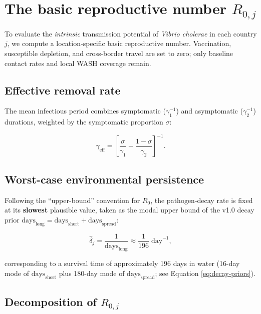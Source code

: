 \documentclass[
]{book}
\begin{document}
\section{\texorpdfstring{The basic reproductive number \(R_{0,j}\)}{The basic reproductive number R\_\{0,j\}}}\label{the-basic-reproductive-number-r_0j}

To evaluate the \emph{intrinsic} transmission potential of \emph{Vibrio cholerae} in each country \(j\), we compute a location‐specific basic reproductive number. Vaccination, susceptible depletion, and cross-border travel are set to zero; only baseline contact rates and local WASH coverage remain.

\subsection{Effective removal rate}\label{effective-removal-rate}

The mean infectious period combines symptomatic (\(\gamma_1^{-1}\)) and asymptomatic (\(\gamma_2^{-1}\)) durations, weighted by the symptomatic proportion \(\sigma\):

\[
\gamma_{\mathrm{eff}}
  = \left[\frac{\sigma}{\gamma_1}
          +\frac{1-\sigma}{\gamma_2}\right]^{-1}.
\]

\subsection{Worst-case environmental persistence}\label{worst-case-environmental-persistence}

Following the ``upper-bound'' convention for \(R_0\), the pathogen-decay rate is fixed at its \textbf{slowest} plausible value, taken as the modal upper bound of the v1.0 decay prior \(\text{days}_{\text{long}} = \text{days}_{\text{short}} + \text{days}_{\text{spread}}\):

\[
\widehat{\delta}_j
  = \frac{1}{\text{days}_{\text{long}}}
  \approx \frac{1}{196}\;\text{day}^{-1},
\]

corresponding to a survival time of approximately 196 days in water (16-day mode of \(\text{days}_{\text{short}}\) plus 180-day mode of \(\text{days}_{\text{spread}}\); see Equation \eqref{eq:decay-priors}).

\subsection{\texorpdfstring{Decomposition of \(R_{0,j}\)}{Decomposition of R\_\{0,j\}}}\label{decomposition-of-r_0j}
\end{document}
